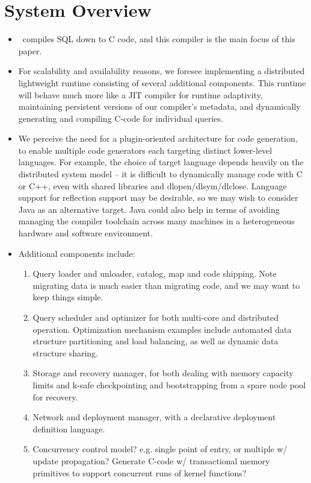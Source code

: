 \section{System Overview}

\begin{itemize}
  \item \compiler\ compiles SQL down to C code, and this compiler is the main
  focus of this paper.

  \item For scalability and availability reasons, we foresee implementing a
  distributed lightweight runtime consisting of several additional
  components. This runtime will behave much more like a JIT compiler for runtime
  adaptivity, maintaining persistent versions of our compiler's metadata, and
  dynamically generating and compiling C-code for individual queries.

  \item We perceive the need for a plugin-oriented architecture for code
  generation, to enable multiple code generators each targeting distinct
  lower-level languages. For example, the choice of target language depends
  heavily on the distributed system model -- it is difficult to dynamically
  manage code with C or C++, even with shared libraries and dlopen/dlsym/dlclose.
  Language support for reflection support may be desirable, so we may wish to
  consider Java as an alternative target. Java could also help in terms of
  avoiding managing the compiler toolchain across many machines in a
  heterogeneous hardware and software environment.

  \item Additional components include:
  \begin{enumerate}
    \item Query loader and unloader, catalog, map and code shipping. Note
    migrating data is much easier than migrating code, and we may want to keep
    things simple.
    \item Query scheduler and optimizer for both multi-core and distributed
    operation. Optimization mechanism examples include automated data structure
    partitioning and load balancing, as well as dynamic data structure sharing.
    \item Storage and recovery manager, for both dealing with memory capacity
    limits and k-safe checkpointing and bootstrapping from a spare node pool for
    recovery.
    \item Network and deployment manager, with a declarative deployment
    definition language.
    \item Concurrency control model? e.g. single point of entry, or
    multiple w/ update propagation? Generate C-code w/ transactional memory
    primitives to support concurrent runs of kernel functions?
  \end{enumerate}
\end{itemize}
